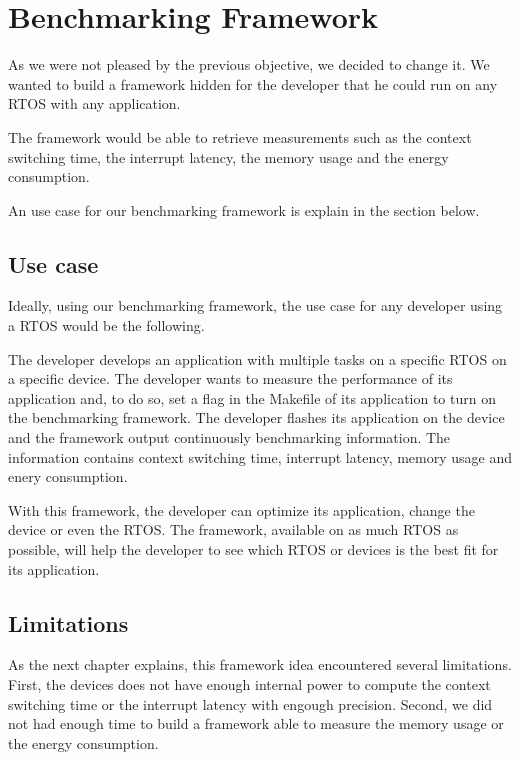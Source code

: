 \section{Benchmarking Framework}
 
As we were not pleased by the previous objective, we decided to change it.
We wanted to build a framework hidden for the developer that he could run on any RTOS with any application.

The framework would be able to retrieve measurements such as the context switching time, the interrupt latency, the memory usage and the energy consumption.

An use case for our benchmarking framework is explain in the section below.

\subsection{Use case}
Ideally, using our benchmarking framework, the use case for any developer using a RTOS would be the following.

The developer develops an application with multiple tasks on a specific RTOS on a specific device.
The developer wants to measure the performance of its application and, to do so, set a flag in the Makefile of its application to turn on the benchmarking framework.
The developer flashes its application on the device and the framework output continuously benchmarking information.
The information contains context switching time, interrupt latency, memory usage and enery consumption.

With this framework, the developer can optimize its application, change the device or even the RTOS.
The framework, available on as much RTOS as possible, will help the developer to see which RTOS or devices is the best fit for its application.

\subsection{Limitations}
As the next chapter explains, this framework idea encountered several limitations.
First, the devices does not have enough internal power to compute the context switching time or the interrupt latency with engough precision.
Second, we did not had enough time to build a framework able to measure the memory usage or the energy consumption.